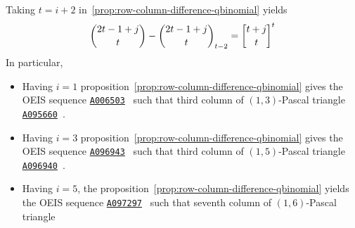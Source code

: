 Taking $t=i+2$ in~\eqref{prop:row-column-difference-qbinomial} yields
\begin{align*}
    \binom{2t-1+j}{t} - \rascalNumber{2t-1+j}{t}{t-2} = \oneQBinomial{t+j}{t}{t}
\end{align*}
In particular,
\begin{itemize}
    \item Having $i=1$ proposition~\eqref{prop:row-column-difference-qbinomial}
    gives the OEIS sequence \href{https://oeis.org/A006503}{\texttt{A006503}}~\cite{sloane1995n}
    such that third column of $(1,3)$-Pascal triangle
    \href{https://oeis.org/A095660}{\texttt{A095660}}~\cite{sloane2004pascal13}.
    \item Having $i=3$ proposition~\eqref{prop:row-column-difference-qbinomial}
    gives the OEIS sequence \href{https://oeis.org/A096943}{\texttt{A096943}}~\cite{sloane2004sixth}
    such that third column of $(1,5)$-Pascal triangle
    \href{https://oeis.org/A096940}{\texttt{A096940}}~\cite{sloane2004pascal}.
    \item Having $i=5$, the proposition~\eqref{prop:row-column-difference-qbinomial} yields
    the OEIS sequence \href{https://oeis.org/A097297}{\texttt{A097297}}~\cite{sloane2004seventh}
    such that seventh column of $(1,6)$-Pascal triangle
\end{itemize}
